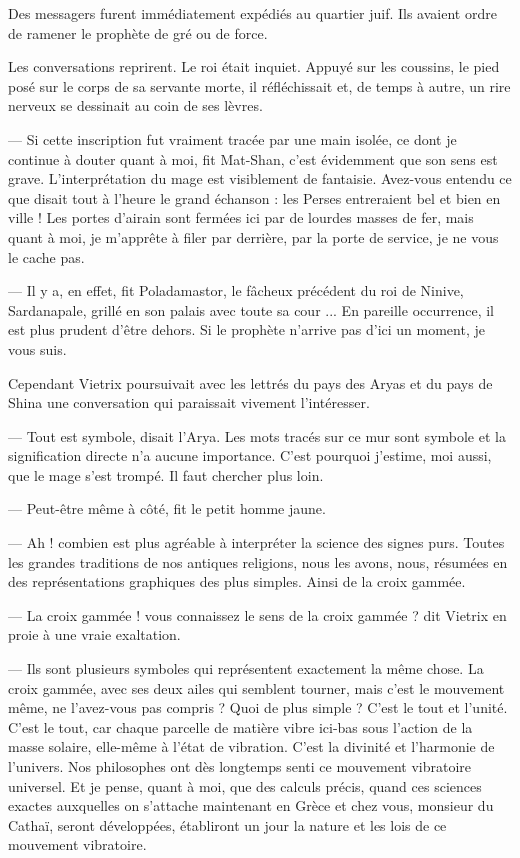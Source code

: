 \documentclass[a4paper, 11pt, oneside, polutonikogreek, french]{article}
\begin{document}
\bigskip
\centerline{\EightStarTaper}
\centerline{\EightStarTaper\EightStarTaper}
\bigskip

Des messagers furent immédiatement expédiés au quartier juif. Ils avaient ordre de ramener le prophète de gré ou de force.

Les conversations reprirent. Le roi était inquiet. Appuyé sur les coussins, le pied posé sur le corps de sa servante morte, il réfléchissait et, de temps à autre, un rire nerveux se dessinait au coin de ses lèvres.

--- Si cette inscription fut vraiment tracée par une main isolée, ce dont je continue à douter quant à moi, fit Mat-Shan, c'est évidemment que son sens est grave. L'interprétation du mage est visiblement de fantaisie. Avez-vous entendu ce que disait tout à l'heure le grand échanson : les Perses entreraient bel et bien en ville ! Les portes d'airain sont fermées ici par de lourdes masses de fer, mais quant à moi, je m'apprête à filer par derrière, par la porte de service, je ne vous le cache pas.

--- Il y a, en effet, fit Poladamastor, le fâcheux précédent du roi de Ninive, Sardanapale, grillé en son palais avec toute sa cour ... En pareille occurrence, il est plus prudent d'être dehors. Si le prophète n'arrive pas d'ici un moment, je vous suis.

Cependant Vietrix poursuivait avec les lettrés du pays des Aryas et du pays de Shina une conversation qui paraissait vivement l'intéresser.

--- Tout est symbole, disait l'Arya. Les mots tracés sur ce mur sont symbole et la signification directe n'a aucune importance. C'est pourquoi j'estime, moi aussi, que le mage s'est trompé. Il faut chercher plus loin.

--- Peut-être même à côté, fit le petit homme jaune.

--- Ah ! combien est plus agréable à interpréter la science des signes purs. Toutes les grandes traditions de nos antiques religions, nous les avons, nous, résumées en des représentations graphiques des plus simples. Ainsi de la croix gammée.

--- La croix gammée ! vous connaissez le sens de la croix gammée ? dit Vietrix en proie à une vraie exaltation.

--- Ils sont plusieurs symboles qui représentent exactement la même chose. La croix gammée, avec ses deux ailes qui semblent tourner, mais c'est le mouvement même, ne l'avez-vous pas compris ? Quoi de plus simple ? C'est le tout et l'unité. C'est le tout, car chaque parcelle de matière vibre ici-bas sous l'action de la masse solaire, elle-même à l'état de vibration. C'est la divinité et l'harmonie de l'univers. Nos philosophes ont dès longtemps senti ce mouvement vibratoire universel. Et je pense, quant à moi, que des calculs précis, quand ces sciences exactes auxquelles on s'attache maintenant en Grèce et chez vous, monsieur du Cathaï, seront développées, établiront un jour la nature et les lois de ce mouvement vibratoire.
\end{document}
